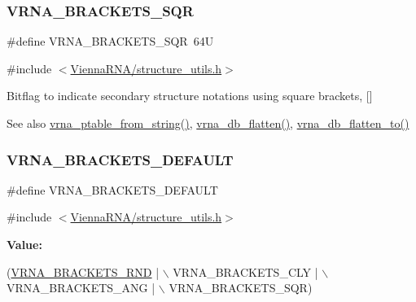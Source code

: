 \subsubsection{\texorpdfstring{V\+R\+N\+A\+\_\+\+B\+R\+A\+C\+K\+E\+T\+S\+\_\+\+S\+QR}{VRNA\_BRACKETS\_SQR}}
{\footnotesize\ttfamily \#define V\+R\+N\+A\+\_\+\+B\+R\+A\+C\+K\+E\+T\+S\+\_\+\+S\+QR~64U}



{\ttfamily \#include $<$\mbox{\hyperlink{structure__utils_8h}{Vienna\+R\+N\+A/structure\+\_\+utils.\+h}}$>$}



Bitflag to indicate secondary structure notations using square brackets, {\ttfamily \mbox{[}\mbox{]}} 

\begin{DoxySeeAlso}{See also}
\mbox{\hyperlink{group__struct__utils_gac76c9ef3de507748fb0416a59323362b}{vrna\+\_\+ptable\+\_\+from\+\_\+string()}}, \mbox{\hyperlink{group__struct__utils_gae966b9f44168a4f4b39ca42ffb5f37b7}{vrna\+\_\+db\+\_\+flatten()}}, \mbox{\hyperlink{group__struct__utils_ga690425199c8b71545e7196e3af1436f8}{vrna\+\_\+db\+\_\+flatten\+\_\+to()}} 
\end{DoxySeeAlso}
\mbox{\label{group__struct__utils_ga559ebf76b1b289f85309f4206e99aa1a}} 
\subsubsection{\texorpdfstring{V\+R\+N\+A\+\_\+\+B\+R\+A\+C\+K\+E\+T\+S\+\_\+\+D\+E\+F\+A\+U\+LT}{VRNA\_BRACKETS\_DEFAULT}}
{\footnotesize\ttfamily \#define V\+R\+N\+A\+\_\+\+B\+R\+A\+C\+K\+E\+T\+S\+\_\+\+D\+E\+F\+A\+U\+LT}



{\ttfamily \#include $<$\mbox{\hyperlink{structure__utils_8h}{Vienna\+R\+N\+A/structure\+\_\+utils.\+h}}$>$}

{\bfseries Value\+:}
\begin{DoxyCode}
(\mbox{\hyperlink{group__struct__utils_gac92d5fa7c6625bce2670ece510a24fbd}{VRNA\_BRACKETS\_RND}} | \(\backslash\)
   VRNA\_BRACKETS\_CLY | \(\backslash\)
   VRNA\_BRACKETS\_ANG | \(\backslash\)
   VRNA\_BRACKETS\_SQR)
\end{DoxyCode}



